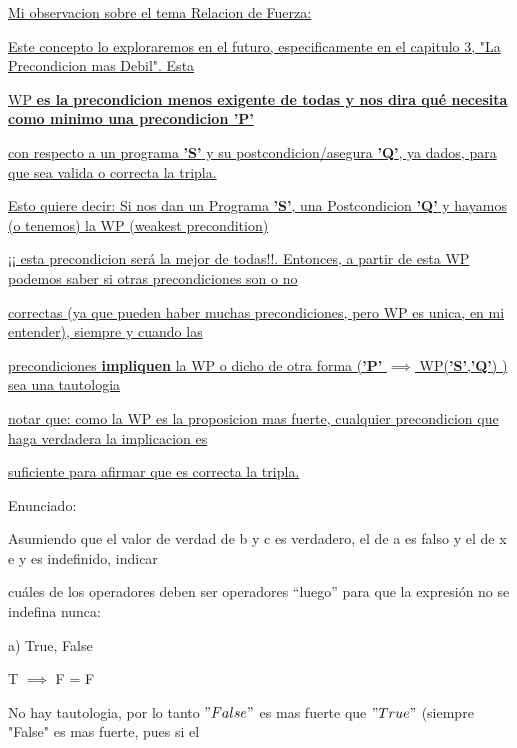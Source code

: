 \documentclass[10pt,a4paper]{article}
\begin{document}
\vspace{0.3cm}

\underline{Mi observacion sobre el tema Relacion de Fuerza:} 

\underline{Este concepto lo exploraremos en el futuro, especificamente en el capitulo 3, "La Precondicion mas Debil". Esta} 

\underline{WP \textbf{es la precondicion menos exigente de todas y nos dira qué necesita como minimo una precondicion 'P'}  }

\underline{con respecto a un programa \textbf{'S'} y su postcondicion/asegura \textbf{'Q'}, ya dados, para que sea valida o correcta la tripla.}

\vspace{0.3cm}

\underline{Esto quiere decir: Si nos dan un Programa \textbf{'S'}, una Postcondicion \textbf{'Q'} y hayamos (o tenemos) la WP (weakest precondition)}

\underline{¡¡ esta precondicion será la mejor de todas!!. Entonces, a partir de esta WP podemos saber si otras precondiciones son o no }

\underline{correctas (ya que pueden haber muchas precondiciones, pero WP es unica, en mi entender), siempre y cuando las  }

\underline{ precondiciones \textbf{impliquen} la WP o dicho de otra forma  (\textbf{'P'} $\implies$ WP(\textbf{'S'},\textbf{'Q'}) ) sea una tautologia }

\vspace{0.3cm}

\underline{notar que: como la WP es la proposicion mas fuerte, cualquier precondicion que haga verdadera la implicacion es }

\underline{suficiente para afirmar que es correcta la tripla.}

\vspace{0.3cm}

Enunciado: 

Asumiendo que el valor de verdad de b y c es verdadero, el de a es falso y el de x e y es indefinido, indicar

cuáles de los operadores deben ser operadores “luego” para que la expresión no se indefina nunca:

\vspace{0.3cm}

a) True, False

T $\implies$ F = F 

No hay tautologia, por lo tanto $"False"$ es mas fuerte que $"True"$ (siempre "False" es mas fuerte, pues si el
\end{document}
